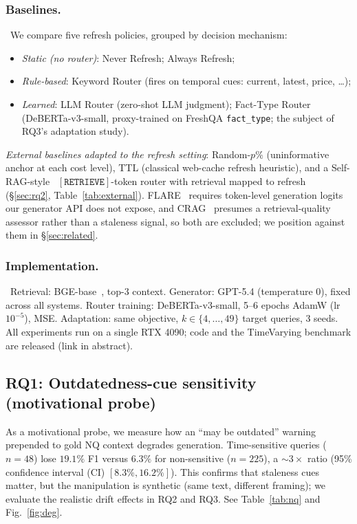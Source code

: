 \documentclass[pdflatex,sn-basic]{sn-jnl}
\begin{document}
\subsubsection*{Baselines.}~We compare five refresh policies, grouped by decision mechanism:
\begin{itemize}
  \item \emph{Static (no router)}: Never Refresh; Always Refresh;
  \item \emph{Rule-based}: Keyword Router (fires on temporal cues: current, latest, price, \ldots);
  \item \emph{Learned}: LLM Router (zero-shot LLM judgment); Fact-Type Router (DeBERTa-v3-small, proxy-trained on FreshQA \texttt{fact\_type}; the subject of RQ3's adaptation study).
\end{itemize}
\emph{External baselines adapted to the refresh setting}: Random-$p\%$ (uninformative anchor at each cost level), TTL (classical web-cache refresh heuristic), and a Self-RAG-style~\cite{asai2023selfrag} $[\texttt{RETRIEVE}]$-token router with retrieval mapped to refresh (§\ref{sec:rq2}, Table~\ref{tab:external}). FLARE~\cite{jiang2023flare} requires token-level generation logits our generator API does not expose, and CRAG~\cite{crag2024} presumes a retrieval-quality assessor rather than a staleness signal, so both are excluded; we position against them in §\ref{sec:related}.

\subsubsection*{Implementation.}~Retrieval: BGE-base~\cite{bge2023}, top-$3$ context. Generator: GPT-5.4 (temperature 0), fixed across all systems. Router training: DeBERTa-v3-small, 5--6 epochs AdamW (lr $10^{-5}$), MSE. Adaptation: same objective, $k \in \{4,\dots,49\}$ target queries, 3 seeds. All experiments run on a single RTX 4090; code and the TimeVarying benchmark are released (link in abstract).

\subsection{RQ1: Outdatedness-cue sensitivity (motivational probe)}
\label{sec:rq1}

As a motivational probe, we measure how an ``may be outdated'' warning prepended to gold NQ context degrades generation. Time-sensitive queries ($n{=}48$) lose $19.1\%$ F1 versus $6.3\%$ for non-sensitive ($n{=}225$), a $\sim$$3{\times}$ ratio (95\% confidence interval (CI) $[8.3\%, 16.2\%]$). This confirms that staleness cues matter, but the manipulation is synthetic (same text, different framing); we evaluate the realistic drift effects in RQ2 and RQ3. See Table~\ref{tab:nq} and Fig.~\ref{fig:deg}.
\end{document}
